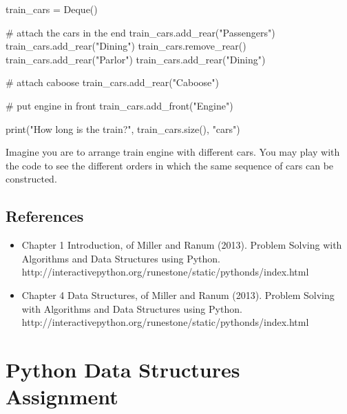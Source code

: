 \documentclass[
  letterpaper,
]{scrbook}
\newenvironment{Shaded}{\begin{snugshade}}{\end{snugshade}}
\newcommand{\BuiltInTok}[1]{\textcolor[rgb]{0.00,0.23,0.31}{#1}}
\newcommand{\CommentTok}[1]{\textcolor[rgb]{0.37,0.37,0.37}{#1}}
\newcommand{\NormalTok}[1]{\textcolor[rgb]{0.00,0.23,0.31}{#1}}
\newcommand{\OperatorTok}[1]{\textcolor[rgb]{0.37,0.37,0.37}{#1}}
\newcommand{\StringTok}[1]{\textcolor[rgb]{0.13,0.47,0.30}{#1}}
\providecommand{\tightlist}{%
  \setlength{\itemsep}{0pt}\setlength{\parskip}{0pt}}
\begin{document}
\begin{Shaded}
\begin{Highlighting}[]
\NormalTok{train\_cars }\OperatorTok{=}\NormalTok{ Deque()}

\CommentTok{\# attach the cars in the end}
\NormalTok{train\_cars.add\_rear(}\StringTok{"Passengers"}\NormalTok{)}
\NormalTok{train\_cars.add\_rear(}\StringTok{"Dining"}\NormalTok{)}
\NormalTok{train\_cars.remove\_rear()}
\NormalTok{train\_cars.add\_rear(}\StringTok{"Parlor"}\NormalTok{)}
\NormalTok{train\_cars.add\_rear(}\StringTok{"Dining"}\NormalTok{)}

\CommentTok{\# attach caboose}
\NormalTok{train\_cars.add\_rear(}\StringTok{"Caboose"}\NormalTok{)}

\CommentTok{\# put engine in front}
\NormalTok{train\_cars.add\_front(}\StringTok{"Engine"}\NormalTok{)}

\BuiltInTok{print}\NormalTok{(}\StringTok{"How long is the train?"}\NormalTok{, train\_cars.size(), }\StringTok{"cars"}\NormalTok{)}
\end{Highlighting}
\end{Shaded}

Imagine you are to arrange train engine with different cars. You may
play with the code to see the different orders in which the same
sequence of cars can be constructed.

\section*{References}\label{references-2}


\begin{itemize}
\tightlist
\item
  Chapter 1 Introduction, of Miller and Ranum (2013). Problem Solving
  with Algorithms and Data Structures using Python.
  http://interactivepython.org/runestone/static/pythonds/index.html
\item
  Chapter 4 Data Structures, of Miller and Ranum (2013). Problem Solving
  with Algorithms and Data Structures using Python.
  http://interactivepython.org/runestone/static/pythonds/index.html
\end{itemize}

\chapter*{Python Data Structures
Assignment}\label{ch-lab-python-data-structures-assignment}
\end{document}
